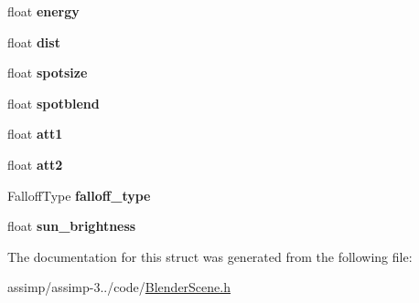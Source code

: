\begin{DoxyCompactItemize}
\item 
\hypertarget{struct_assimp_1_1_blender_1_1_lamp_aa469469ad1744a79df79d2cb11ea9ca0}{float {\bfseries energy}}\label{struct_assimp_1_1_blender_1_1_lamp_aa469469ad1744a79df79d2cb11ea9ca0}

\item 
\hypertarget{struct_assimp_1_1_blender_1_1_lamp_a919f2bcd0c860eeefd1a5ac764e94504}{float {\bfseries dist}}\label{struct_assimp_1_1_blender_1_1_lamp_a919f2bcd0c860eeefd1a5ac764e94504}

\item 
\hypertarget{struct_assimp_1_1_blender_1_1_lamp_a6f994845f42fa7dc4b4cc522a47b12f0}{float {\bfseries spotsize}}\label{struct_assimp_1_1_blender_1_1_lamp_a6f994845f42fa7dc4b4cc522a47b12f0}

\item 
\hypertarget{struct_assimp_1_1_blender_1_1_lamp_a90b5a1b9cbc6d6a30f54c517c1862c15}{float {\bfseries spotblend}}\label{struct_assimp_1_1_blender_1_1_lamp_a90b5a1b9cbc6d6a30f54c517c1862c15}

\item 
\hypertarget{struct_assimp_1_1_blender_1_1_lamp_a3b22332f2606ed532ea2b3859383dcab}{float {\bfseries att1}}\label{struct_assimp_1_1_blender_1_1_lamp_a3b22332f2606ed532ea2b3859383dcab}

\item 
\hypertarget{struct_assimp_1_1_blender_1_1_lamp_a489b0bfaa91a9b082510aeeb791511e3}{float {\bfseries att2}}\label{struct_assimp_1_1_blender_1_1_lamp_a489b0bfaa91a9b082510aeeb791511e3}

\item 
\hypertarget{struct_assimp_1_1_blender_1_1_lamp_a55f361a214784dc7b4cdff308bb9a028}{Falloff\+Type {\bfseries falloff\+\_\+type}}\label{struct_assimp_1_1_blender_1_1_lamp_a55f361a214784dc7b4cdff308bb9a028}

\item 
\hypertarget{struct_assimp_1_1_blender_1_1_lamp_af3b3cc878d876d12c3b6b57a77603123}{float {\bfseries sun\+\_\+brightness}}\label{struct_assimp_1_1_blender_1_1_lamp_af3b3cc878d876d12c3b6b57a77603123}

\end{DoxyCompactItemize}


The documentation for this struct was generated from the following file\+:\begin{DoxyCompactItemize}
\item 
assimp/assimp-\/3../code/\hyperlink{_blender_scene_8h}{Blender\+Scene.\+h}\end{DoxyCompactItemize}

